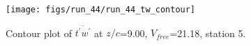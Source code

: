 \begin{figure}[H]
\centering
\texttt{[image: figs/run\_44/run\_44\_tw\_contour]}
\caption{Contour plot of $\overline{t^\prime w^\prime}$ at $z/c$=9.00, $V_{free}$=21.18, station 5.}
\label{fig:run_44_tw_contour}
\end{figure}



